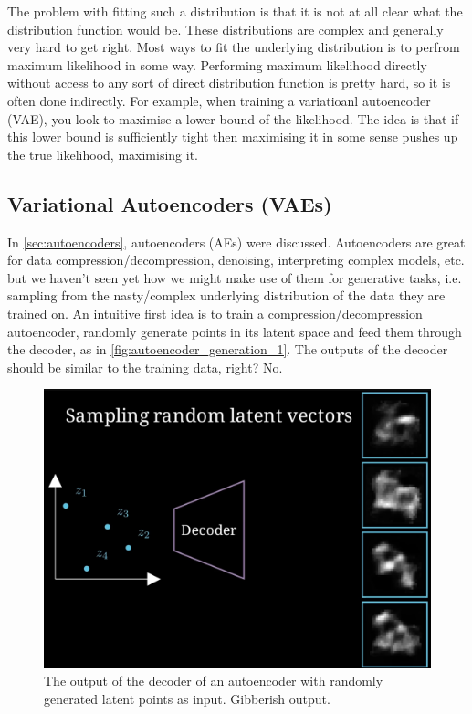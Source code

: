 \documentclass[11pt]{article}
\begin{document}
The problem with fitting such a distribution is that it is not at all clear what the distribution function would be. These distributions are complex and generally very hard to get right. Most ways to fit the underlying distribution is to perfrom maximum likelihood in some way. Performing maximum likelihood directly without access to any sort of direct distribution function is pretty hard, so it is often done indirectly. For example, when training a variatioanl autoencoder (VAE), you look to maximise a lower bound of the likelihood. The idea is that if this lower bound is sufficiently tight then maximising it in some sense pushes up the true likelihood, maximising it.

\subsection{Variational Autoencoders (VAEs)}
In \autoref{sec:autoencoders}, autoencoders (AEs) were discussed. Autoencoders are great for data compression/decompression, denoising, interpreting complex models, etc. but we haven't seen yet how we might make use of them for generative tasks, i.e. sampling from the nasty/complex underlying distribution of the data they are trained on. An intuitive first idea is to train a compression/decompression autoencoder, randomly generate points in its latent space and feed them through the decoder, as in \autoref{fig:autoencoder_generation_1}. The outputs of the decoder should be similar to the training data, right? No.

\begin{figure}[ht]
    \centering
    \includegraphics[width=0.60\columnwidth]{./figures/generative_models/AEs_gen_1.png}
    \caption{\centering The output of the decoder of an autoencoder with randomly generated latent points as input. Gibberish output.}
    \label{fig:autoencoder_generation_1}
\end{figure}
\end{document}
